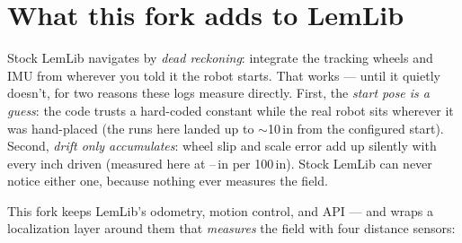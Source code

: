 \documentclass[11pt]{article}
\begin{document}
\section{What this fork adds to LemLib}
Stock LemLib navigates by \emph{dead reckoning}: integrate the tracking wheels and
IMU from wherever you told it the robot starts. That works --- until it quietly
doesn't, for two reasons these logs measure directly. First, the \emph{start pose
is a guess}: the code trusts a hard-coded constant while the real robot sits
wherever it was hand-placed (the runs here landed up to $\sim$10\,in from the
configured start). Second, \emph{drift only accumulates}: wheel slip and scale
error add up silently with every inch driven (measured here at
\RunThreeDriftPer--\RunTwoDriftPer\,in per 100\,in). Stock LemLib can never notice
either one, because nothing ever measures the field.

This fork keeps LemLib's odometry, motion control, and API --- and wraps a
localization layer around them that \emph{measures} the field with four distance
sensors:
\end{document}
